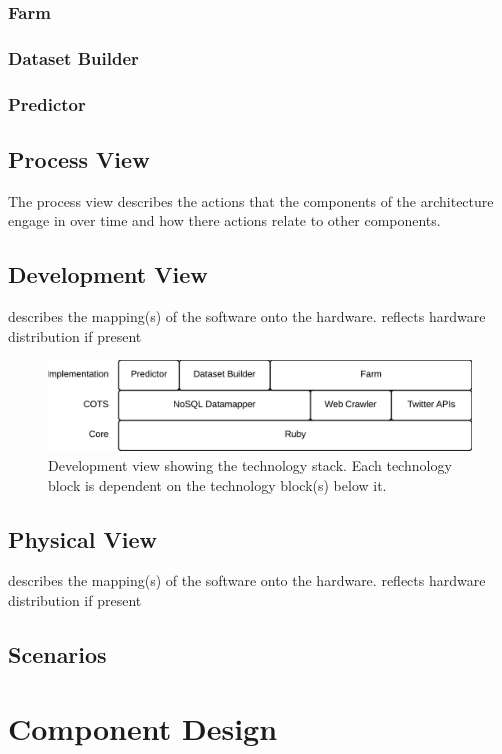 \subsubsection{Farm}


\subsubsection{Dataset Builder}

\subsubsection{Predictor}


\subsection{Process View}
The process view describes the actions that the components of the architecture engage in over time and how there actions relate to other components.

\subsection{Development View}
describes the mapping(s) of the software onto the hardware. reflects hardware distribution if present

\begin{figure}[H]
\centerline{\includegraphics[width=4.5in]{image/architecture-development-view.png}}
\caption{Development view showing the technology stack. Each technology block is dependent on the technology block(s) below it.}
\label{figure:development-view-notation}
\end{figure}

\subsection{Physical View}
describes the mapping(s) of the software onto the hardware. reflects hardware distribution if present

\subsection{Scenarios}

\section{Component Design}


